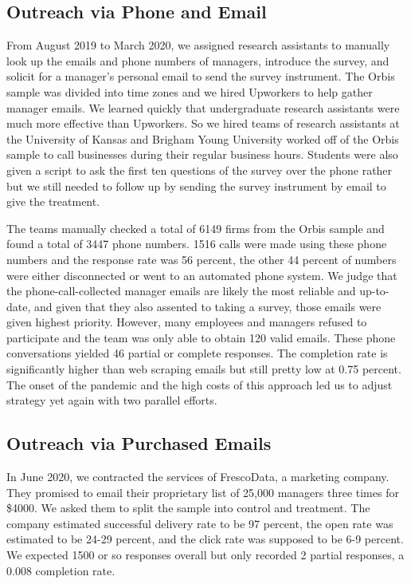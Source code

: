 \subsection{Outreach via Phone and Email}
From August 2019 to March 2020, we assigned research assistants to manually look up the emails and phone numbers of managers, introduce the survey, and solicit for a manager's personal email to send the survey instrument. The Orbis sample was divided into time zones and we hired Upworkers to help gather manager emails. We learned quickly that undergraduate research assistants were much more effective than Upworkers. So we hired teams of research assistants at the University of Kansas and Brigham Young University worked off of the Orbis sample to call businesses during their regular business hours. Students were also given a script to ask the first ten questions of the survey over the phone rather but we still needed to follow up by sending the survey instrument by email to give the treatment. 

The teams manually checked a total of 6149 firms from the Orbis sample and found a total of 3447 phone numbers. 1516 calls were made using these phone numbers and the response rate was 56 percent, the other 44 percent of numbers were either disconnected or went to an automated phone system. We judge that the phone-call-collected manager emails are likely the most reliable and up-to-date, and given that they also assented to taking a survey, those emails were given highest priority. However, many employees and managers refused to participate and the team was only able to obtain 120 valid emails. These phone conversations yielded 46 partial or complete responses. The completion rate is significantly higher than web scraping emails but still pretty low at 0.75 percent. The onset of the pandemic and the high costs of this approach led us to adjust strategy yet again with two parallel efforts.  

\subsection{Outreach via Purchased Emails}
In June 2020, we contracted the services of FrescoData, a marketing company. They promised to email their proprietary list of 25,000 managers three times for \$4000. We asked them to split the sample into control and treatment. The company estimated successful delivery rate to be 97 percent, the open rate was estimated to be 24-29 percent, and the click rate was supposed to be 6-9 percent. We expected 1500 or so responses overall but only recorded 2 partial responses, a 0.008 completion rate.    

